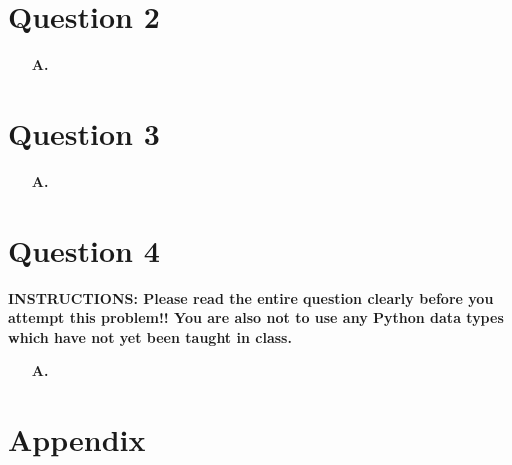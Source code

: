 \newpage
\section{Question 2}
\begin{enumerate}
\item[\textbf{A.}]
\end{enumerate}

\newpage
\section{Question 3}
\begin{enumerate}
\item[\textbf{A.}]
\end{enumerate}

\newpage
\section{Question 4}
\textbf{INSTRUCTIONS: Please read the entire question clearly before you attempt this problem!! 
You are also not to use any Python data types which have not yet been taught in class.}
\begin{enumerate}
\item[\textbf{A.}]
\end{enumerate}

\newpage
\section{Appendix}

